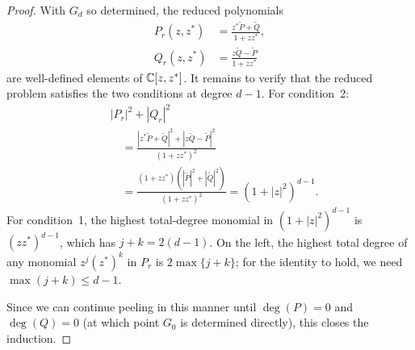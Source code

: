 \begin{proof}
	With $G_d$ so determined, the reduced polynomials
	\begin{align}
		P_r(z, z^*) &= \frac{z^*\widetilde{P} + \widetilde{Q}}{1 + zz^*},
		\nonumber\\
		Q_r(z, z^*) &= \frac{z\widetilde{Q} - \widetilde{P}}{1 + zz^*}
		\tag{A31}
	\end{align}
	are well-defined elements of $\mathbb{C}[z, z^*]$.  It remains
	to verify that the reduced problem satisfies the two
	conditions at degree $d - 1$.  For condition~2:
	\begin{align}
		&|P_r|^2 + |Q_r|^2
		\nonumber\\
		&\quad = \frac{|z^*\widetilde{P} + \widetilde{Q}|^2
		+ |z\widetilde{Q} - \widetilde{P}|^2}{(1+zz^*)^2}
		\nonumber                                          \\
		&\quad = \frac{(1+zz^*)(|\widetilde{P}|^2
		+ |\widetilde{Q}|^2)}{(1+zz^*)^2}
		= (1+|z|^2)^{d-1}.
		\tag{A32}
	\end{align}
	For condition~1, the highest total-degree monomial in
	$(1+|z|^2)^{d-1}$ is $(zz^*)^{d-1}$, which has
	$j + k = 2(d-1)$.  On the left, the highest total
	degree of any monomial $z^j(z^*)^k$ in $P_r$ is
	$2\max\{j+k\}$; for the identity to hold, we need
	$\max(j+k) \leq d-1$.

	Since we can continue peeling in this manner until
	$\deg(P) = 0$ and $\deg(Q) = 0$ (at which point
	$G_0$ is determined directly), this closes the
	induction.
\end{proof}
